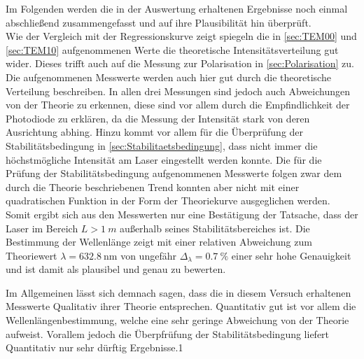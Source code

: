 Im Folgenden werden die in der Auswertung erhaltenen Ergebnisse noch einmal abschließend zusammengefasst 
und auf ihre Plausibilität hin überprüft.\\

Wie der Vergleich mit der Regressionskurve zeigt spiegeln die in \cref{sec:TEM00} und \cref{sec:TEM10} aufgenommenen Werte 
die theoretische Intensitätsverteilung gut wider. Dieses trifft auch auf die Messung zur Polarisation in \cref{sec:Polarisation}
zu. Die aufgenommenen Messwerte werden auch hier gut durch die theoretische Verteilung beschreiben. In allen drei Messungen 
sind jedoch auch Abweichungen von der Theorie zu erkennen, diese sind vor allem durch die Empfindlichkeit der Photodiode 
zu erklären, da die Messung der Intensität stark von deren Ausrichtung abhing. Hinzu kommt vor allem für die 
Überprüfung der Stabilitätsbedingung in \cref{sec:Stabilitaetsbedingung}, dass nicht immer die höchstmögliche Intensität am Laser 
eingestellt werden konnte. Die für die Prüfung der Stabilitätsbedingung aufgenommenen Messwerte folgen zwar dem durch die Theorie
beschriebenen Trend konnten aber nicht mit einer quadratischen Funktion in der Form der Theoriekurve ausgeglichen werden.
Somit ergibt sich aus den Messwerten nur eine Bestätigung der Tatsache, dass der Laser im Bereich $L > \SI{1}{m}$ außerhalb seines
Stabilitätsbereiches ist.
Die Bestimmung der Wellenlänge zeigt mit einer relativen Abweichung zum Theoriewert $\lambda = \SI{632.8}{\nm}$ 
von ungefähr $\Delta_{\lambda} = \SI{0.7}{\percent}$  einer sehr hohe Genauigkeit und ist damit als plausibel und genau zu bewerten.

Im Allgemeinen lässt sich demnach sagen, dass die in diesem Versuch erhaltenen Messwerte Qualitativ ihrer Theorie entsprechen.
Quantitativ gut ist vor allem die Wellenlängenbestimmung, welche eine sehr geringe Abweichung von der Theorie aufweist.
Vorallem jedoch die Überpfrüfung der Stabilitätsbedingung liefert Quantitativ nur sehr dürftig Ergebnisse.1  